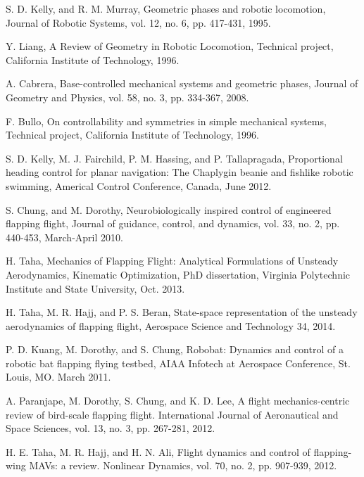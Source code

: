 \documentclass[letterpaper, 10 pt, conference]{ieeeconf}  \newcommand{\RN}[1]{\textup{\uppercase\expandafter{\romannumeral#1}}}
\begin{document}
\begin{thebibliography}{99}

 S. D. Kelly, and R. M. Murray, Geometric phases and robotic locomotion, Journal of Robotic Systems, vol. 12, no. 6, pp. 417-431, 1995.

 Y. Liang, A Review of Geometry in Robotic Locomotion, Technical project, California Institute of Technology, 1996.

 A. Cabrera, Base-controlled mechanical systems and geometric phases, Journal of Geometry and Physics, vol. 58, no. 3, pp. 334-367, 2008.

 F. Bullo, On controllability and symmetries in simple mechanical systems, Technical project, California Institute of Technology, 1996.

 S. D. Kelly, M. J. Fairchild, P. M. Hassing, and P. Tallapragada, Proportional heading control for planar navigation: The Chaplygin beanie and fishlike robotic swimming, Americal Control Conference, Canada, June 2012.

 S. Chung, and  M. Dorothy, Neurobiologically inspired control of engineered flapping flight, Journal of guidance, control, and dynamics, vol. 33, no. 2, pp. 440-453, March-April 2010.

 H. Taha, Mechanics of Flapping Flight: Analytical Formulations of Unsteady Aerodynamics, Kinematic Optimization, PhD dissertation, Virginia Polytechnic Institute and State University, Oct. 2013.

 H. Taha, M. R. Hajj, and P. S. Beran, State-space representation of the unsteady aerodynamics of flapping flight, Aerospace Science and Technology 34, 2014.

 P. D. Kuang, M. Dorothy, and S. Chung, Robobat: Dynamics and control of a robotic bat flapping flying testbed, AIAA Infotech at Aerospace Conference, St. Louis, MO. March 2011.

 A. Paranjape, M. Dorothy, S. Chung, and K. D. Lee, A flight mechanics-centric review of bird-scale flapping flight. International Journal of Aeronautical and Space Sciences, vol. 13, no. 3, pp. 267-281, 2012.

 H. E. Taha, M. R. Hajj, and H. N. Ali, Flight dynamics and control of flapping-wing MAVs: a review. Nonlinear Dynamics, vol. 70, no. 2, pp. 907-939, 2012.


\end{thebibliography}
\end{document}
